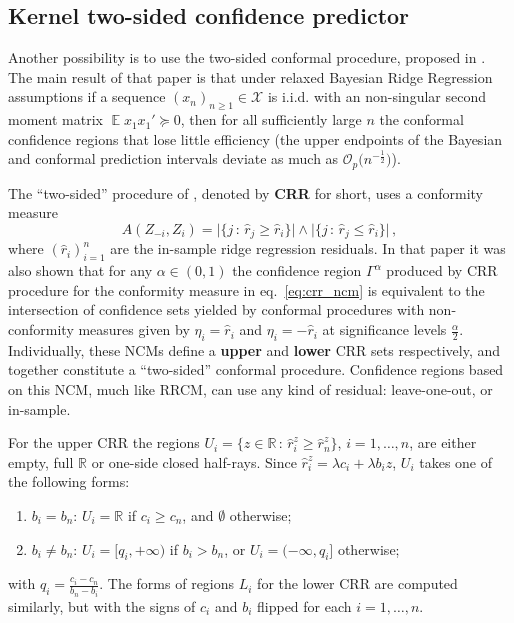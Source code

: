 \documentclass[conference]{IEEEtran}
\newcommand{\ex}{\mathop{\mathbb{E}}\nolimits}
\newcommand{\Xcal}{\mathcal{X}}
\newcommand{\Real}{\mathbb{R}}
\begin{document}

\subsection{Kernel two-sided confidence predictor} %
\label{sub:kernel_crr}

Another possibility is to use the two-sided conformal procedure, proposed in \cite{burnaevV14}.
The main result of that paper is that under relaxed Bayesian Ridge Regression assumptions
if a sequence $(x_n)_{n\geq1}\in\Xcal$ is i.i.d. with an non-singular second moment
matrix $\ex x_1x_1' \succeq 0$, then for all sufficiently large $n$ the conformal
confidence regions that lose little efficiency (the upper endpoints of the Bayesian
and conformal prediction intervals deviate as much as $\mathcal{O}_p\bigl(n^{-\frac{1}{2}}\bigr)$).

The ``two-sided'' procedure of \cite{burnaevV14}, denoted by \textbf{CRR} for short,
uses a conformity measure
\begin{equation} \label{eq:crr_ncm}
  A(Z_{-i}, Z_i)
    = \bigl\lvert\{j\,:\, \hat{r}_j \geq \hat{r}_i \} \bigr\rvert \wedge
       \bigl\lvert\{j\,:\, \hat{r}_j \leq \hat{r}_i \} \bigr\rvert \,,
\end{equation}
where $(\hat{r}_i)_{i=1}^n$ are the in-sample ridge regression residuals.
In that paper it was also shown that for any $\alpha \in (0,1)$ the confidence
region $\Gamma^\alpha$ produced by CRR procedure for the conformity measure in
eq.~\ref{eq:crr_ncm} is equivalent to the intersection of confidence sets yielded
by conformal procedures with non-conformity measures given by $\eta_i = \hat{r}_i$
and $\eta_i = -\hat{r}_i$ at significance levels $\frac{\alpha}{2}$. Individually,
these NCMs define a \textbf{upper} and \textbf{lower} CRR sets respectively, and
together constitute a ``two-sided'' conformal procedure. Confidence regions based
on this NCM, much like RRCM, can use any kind of residual: leave-one-out, or in-sample.

For the upper CRR the regions $U_i = \{z\in\Real\,:\, \hat{r}_i^z \geq \hat{r}_n^z\}$,
$i=1,\ldots, n$, are either empty, full $\Real$ or one-side closed half-rays. Since
$\hat{r}_i^z = \lambda c_i + \lambda b_i z$, $U_i$ takes one of the following forms:
\begin{enumerate}
  \item $b_i=b_n$: $U_i = \Real$ if $c_i\geq c_n$, and $\emptyset$ otherwise;
  \item $b_i\neq b_n$: $U_i = [q_i, +\infty)$ if $b_i>b_n$, or
  $U_i = (-\infty, q_i]$ otherwise;
\end{enumerate}
with $q_i = \frac{c_i-c_n}{b_n-b_i}$. The forms of regions $L_i$ for the lower CRR
are computed similarly, but with the signs of $c_i$ and $b_i$ flipped for each $i=1, \ldots, n$.
\end{document}
